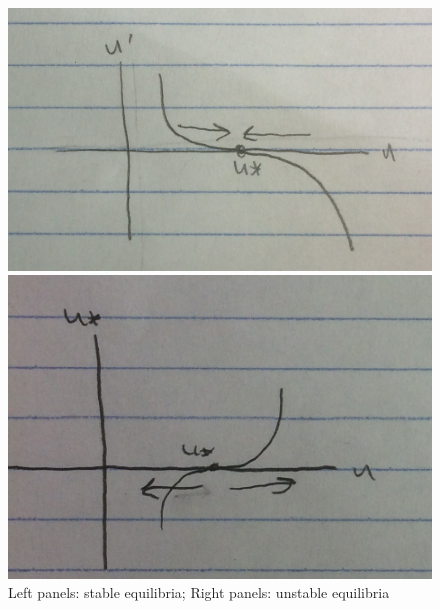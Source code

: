 \documentclass[main.tex]{subfiles}
\begin{document}
\begin{figure}
\begin{multicols}{2}
    \includegraphics[width=\linewidth]{stable-tangent}\par
    \includegraphics[width=\linewidth]{unstable-tangent}\par
\end{multicols}
\caption{Left panels: stable equilibria; Right panels: unstable equilibria}
\end{figure}
\end{document}
